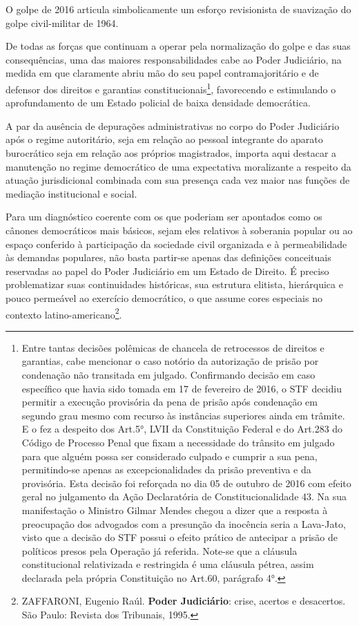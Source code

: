 O golpe de 2016 articula simbolicamente um esforço revisionista de
suavização do golpe civil-militar de 1964.

De todas as forças que continuam a operar pela normalização do golpe e
das suas consequências, uma das maiores responsabilidades cabe ao Poder
Judiciário, na medida em que claramente abriu mão do seu papel
contramajoritário e de defensor dos direitos e garantias
constitucionais\footnote{Entre tantas decisões polêmicas de chancela de
  retrocessos de direitos e garantias, cabe mencionar o caso notório da
  autorização de prisão por condenação não transitada em julgado.
  Confirmando decisão em caso específico que havia sido tomada em 17 de
  fevereiro de 2016, o STF decidiu permitir a execução provisória da
  pena de prisão após condenação em segundo grau mesmo com recurso às
  instâncias superiores ainda em trâmite. E o fez a despeito dos Art.5°,
  LVII da Constituição Federal e do Art.283 do Código de Processo Penal
  que fixam a necessidade do trânsito em julgado para que alguém possa
  ser considerado culpado e cumprir a sua pena, permitindo-se apenas as
  excepcionalidades da prisão preventiva e da provisória. Esta decisão
  foi reforçada no dia 05 de outubro de 2016 com efeito geral no
  julgamento da Ação Declaratória de Constitucionalidade 43. Na sua
  manifestação o Ministro Gilmar Mendes chegou a dizer que a resposta à
  preocupação dos advogados com a presunção da inocência seria a
  Lava-Jato, visto que a decisão do STF possui o efeito prático de
  antecipar a prisão de políticos presos pela Operação já referida.
  Note-se que a cláusula constitucional relativizada e restringida é uma
  cláusula pétrea, assim declarada pela própria Constituição no Art.60,
  parágrafo 4°.}, favorecendo e estimulando o aprofundamento de um
Estado policial de baixa densidade democrática.

A par da ausência de depurações administrativas no corpo do Poder
Judiciário após o regime autoritário, seja em relação ao pessoal
integrante do aparato burocrático seja em relação aos próprios
magistrados, importa aqui destacar a manutenção no regime democrático de
uma expectativa moralizante a respeito da atuação jurisdicional
combinada com sua presença cada vez maior nas funções de mediação
institucional e social.

Para um diagnóstico coerente com os que poderiam ser apontados como os
cânones democráticos mais básicos, sejam eles relativos à soberania
popular ou ao espaço conferido à participação da sociedade civil
organizada e à permeabilidade às demandas populares, não basta partir-se
apenas das definições conceituais reservadas ao papel do Poder
Judiciário em um Estado de Direito. É preciso problematizar suas
continuidades históricas, sua estrutura elitista, hierárquica e pouco
permeável ao exercício democrático, o que assume cores especiais no
contexto latino-americano\footnote{ZAFFARONI, Eugenio Raúl.
  \textbf{Poder Judiciário}: crise, acertos e desacertos. São Paulo:
  Revista dos Tribunais, 1995.}.

